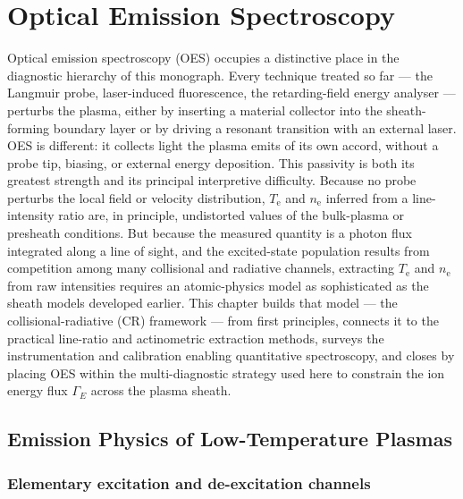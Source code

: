 \chapter{Optical Emission Spectroscopy}
\label{ch:oes}

Optical emission spectroscopy (OES) occupies a distinctive place in the diagnostic hierarchy of this monograph. Every technique treated so far — the Langmuir probe, laser-induced fluorescence, the retarding-field energy analyser — perturbs the plasma, either by inserting a material collector into the sheath-forming boundary layer or by driving a resonant transition with an external laser. OES is different: it collects light the plasma emits of its own accord, without a probe tip, biasing, or external energy deposition. This passivity is both its greatest strength and its principal interpretive difficulty. Because no probe perturbs the local field or velocity distribution, $T_{\mathrm{e}}$ and $n_{\mathrm{e}}$ inferred from a line-intensity ratio are, in principle, undistorted values of the bulk-plasma or presheath conditions. But because the measured quantity is a photon flux integrated along a line of sight, and the excited-state population results from competition among many collisional and radiative channels, extracting $T_{\mathrm{e}}$ and $n_{\mathrm{e}}$ from raw intensities requires an atomic-physics model as sophisticated as the sheath models developed earlier. This chapter builds that model — the collisional-radiative (CR) framework — from first principles, connects it to the practical line-ratio and actinometric extraction methods, surveys the instrumentation and calibration enabling quantitative spectroscopy, and closes by placing OES within the multi-diagnostic strategy used here to constrain the ion energy flux $\Gamma_{E}$ across the plasma sheath.

\section{Emission Physics of Low-Temperature Plasmas}

\subsection{Elementary excitation and de-excitation channels}

